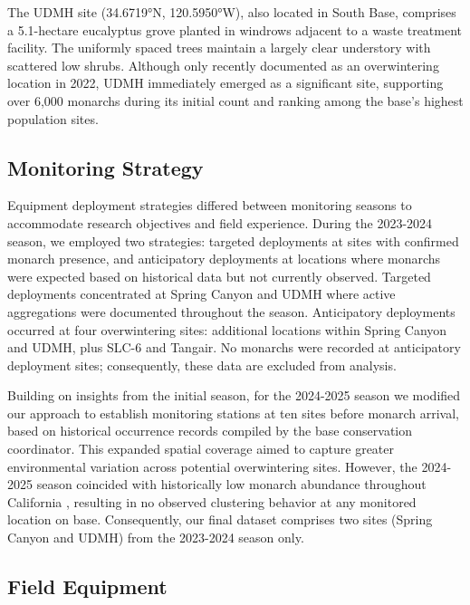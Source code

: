 The UDMH site (34.6719°N, 120.5950°W), also located in South Base, comprises a 5.1-hectare eucalyptus grove planted in windrows adjacent to a waste treatment facility. The uniformly spaced trees maintain a largely clear understory with scattered low shrubs. Although only recently documented as an overwintering location in 2022, UDMH immediately emerged as a significant site, supporting over 6,000 monarchs during its initial count and ranking among the base's highest population sites.


\subsection{Monitoring Strategy}

Equipment deployment strategies differed between monitoring seasons to accommodate research objectives and field experience. During the 2023-2024 season, we employed two strategies: targeted deployments at sites with confirmed monarch presence, and anticipatory deployments at locations where monarchs were expected based on historical data but not currently observed. Targeted deployments concentrated at Spring Canyon and UDMH where active aggregations were documented throughout the season. Anticipatory deployments occurred at four overwintering sites: additional locations within Spring Canyon and UDMH, plus SLC-6 and Tangair. No monarchs were recorded at anticipatory deployment sites; consequently, these data are excluded from analysis.

Building on insights from the initial season, for the 2024-2025 season we modified our approach to establish monitoring stations at ten sites before monarch arrival, based on historical occurrence records compiled by the base conservation coordinator. This expanded spatial coverage aimed to capture greater environmental variation across potential overwintering sites. However, the 2024-2025 season coincided with historically low monarch abundance throughout California \autocite{xerces_society_western_2025}, resulting in no observed clustering behavior at any monitored location on base. Consequently, our final dataset comprises two sites (Spring Canyon and UDMH) from the 2023-2024 season only.

\subsection{Field Equipment}

